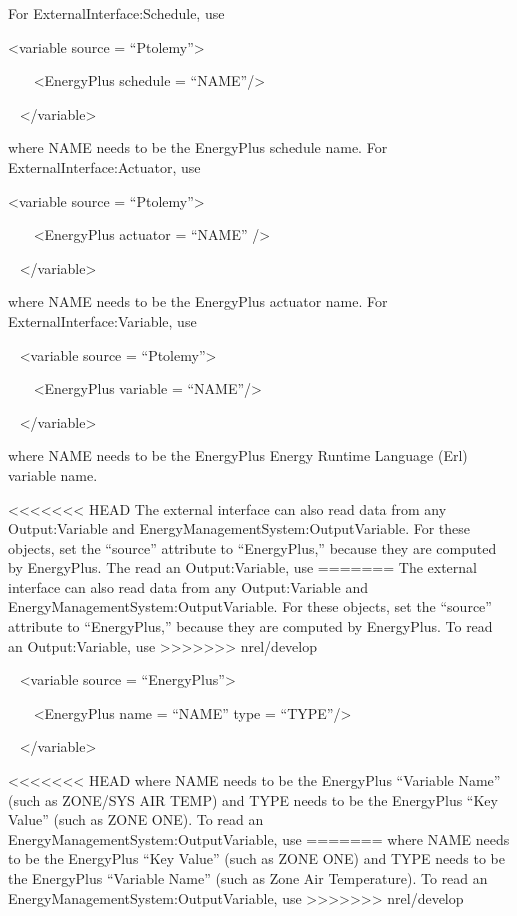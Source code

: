 For ExternalInterface:Schedule, use

\textless{}variable source = ``Ptolemy''\textgreater{}

~~~ \textless{}EnergyPlus schedule = ``NAME''/\textgreater{}

~ \textless{}/variable\textgreater{}

where NAME needs to be the EnergyPlus schedule name. For ExternalInterface:Actuator, use

\textless{}variable source = ``Ptolemy''\textgreater{}

~~~ \textless{}EnergyPlus actuator = ``NAME'' /\textgreater{}

~ \textless{}/variable\textgreater{}

where NAME needs to be the EnergyPlus actuator name. For ExternalInterface:Variable, use

~ \textless{}variable source = ``Ptolemy''\textgreater{}

~~~ \textless{}EnergyPlus variable = ``NAME''/\textgreater{}

~ \textless{}/variable\textgreater{}

where NAME needs to be the EnergyPlus Energy Runtime Language (Erl) variable name.

<<<<<<< HEAD
The external interface can also read data from any Output:Variable and EnergyManagementSystem:OutputVariable. For these objects, set the ``source'' attribute to ``EnergyPlus,'' because they are computed by EnergyPlus. The read an Output:Variable, use
=======
The external interface can also read data from any Output:Variable and EnergyManagementSystem:OutputVariable. For these objects, set the ``source'' attribute to ``EnergyPlus,'' because they are computed by EnergyPlus. To read an Output:Variable, use
>>>>>>> nrel/develop

~ \textless{}variable source = ``EnergyPlus''\textgreater{}

~~~ \textless{}EnergyPlus name = ``NAME'' type = ``TYPE''/\textgreater{}

~ \textless{}/variable\textgreater{}

<<<<<<< HEAD
where NAME needs to be the EnergyPlus ``Variable Name'' (such as ZONE/SYS AIR TEMP) and TYPE needs to be the EnergyPlus ``Key Value'' (such as ZONE ONE). To read an EnergyManagementSystem:OutputVariable, use
=======
where NAME needs to be the EnergyPlus ``Key Value'' (such as ZONE ONE) and TYPE needs to be the EnergyPlus ``Variable Name'' (such as Zone Air Temperature). To read an EnergyManagementSystem:OutputVariable, use
>>>>>>> nrel/develop

